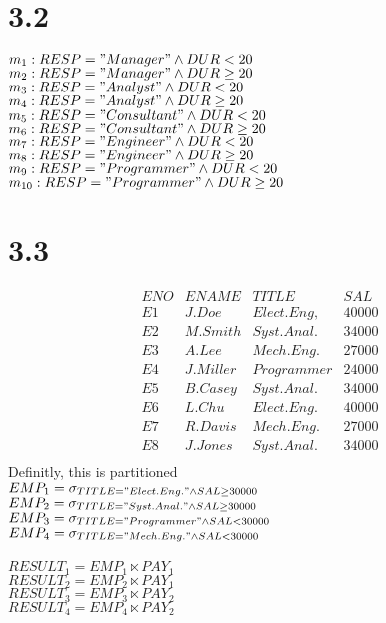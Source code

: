 \documentclass{article}
\begin{document}
	\begin{CJK}{UTF8}{gbsn}
	\section*{3.2}
	$m_1:RESP="Manager"\land DUR<20$\\
	$m_2:RESP="Manager"\land DUR\ge 20$\\
	$m_3:RESP="Analyst"\land DUR<20$\\
	$m_4:RESP="Analyst"\land DUR\ge 20$\\
	$m_5:RESP="Consultant"\land DUR<20$\\
	$m_6:RESP="Consultant"\land DUR\ge 20$\\
	$m_7:RESP="Engineer"\land DUR<20$\\
	$m_8:RESP="Engineer"\land DUR\ge 20$\\
	$m_9:RESP="Programmer"\land DUR<20$\\
	$m_{10}:RESP="Programmer"\land DUR\ge20$\\
	\section*{3.3}	
	\begin{equation*}
	\begin{array}{l|l|l|l}
		ENO&ENAME&TITLE&SAL\\
		E1&J.Doe&Elect.Eng,&40000\\
		E2&M.Smith&Syst.Anal.&34000\\
		E3&A.Lee&Mech.Eng.&27000\\
		E4&J.Miller&Programmer&24000\\
		E5&B.Casey&Syst.Anal.&34000\\
		E6&L.Chu&Elect.Eng.&40000\\
		E7&R.Davis&Mech.Eng.&27000\\
		E8&J.Jones&Syst.Anal.&34000\\
	\end{array}	
	\end{equation*}
	Definitly, this is partitioned\\
	$EMP_1=\sigma_{TITLE="Elect.Eng."\land SAL \ge 30000}$\\
	$EMP_2=\sigma_{TITLE="Syst.Anal."\land SAL \ge 30000}$\\
	$EMP_3=\sigma_{TITLE="Programmer"\land SAL < 30000}$\\
	$EMP_4=\sigma_{TITLE="Mech.Eng."\land SAL < 30000}$\\
	\\
	$RESULT_1=EMP_1\ltimes PAY_1$\\
	$RESULT_2=EMP_2\ltimes PAY_1$\\
	$RESULT_3=EMP_3\ltimes PAY_2$\\
	$RESULT_4=	EMP_4\ltimes PAY_2$\\	
	\end{CJK}
\end{document}
